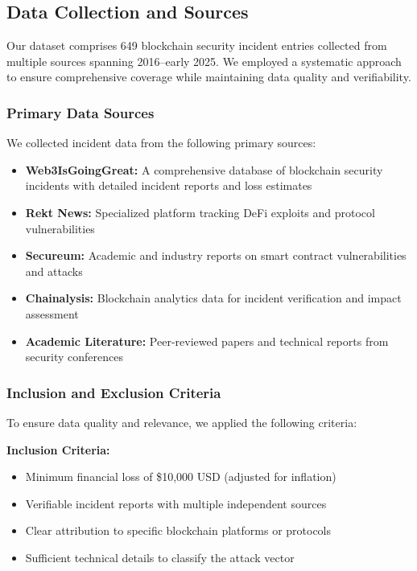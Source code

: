 \subsection{Data Collection and Sources}
\label{sec:data_collection}

Our dataset comprises 649 blockchain security incident entries collected from multiple sources spanning 2016--early 2025. We employed a systematic approach to ensure comprehensive coverage while maintaining data quality and verifiability.

\subsubsection{Primary Data Sources}
We collected incident data from the following primary sources:
\begin{itemize}
    \item \textbf{Web3IsGoingGreat:} A comprehensive database of blockchain security incidents with detailed incident reports and loss estimates
    \item \textbf{Rekt News:} Specialized platform tracking DeFi exploits and protocol vulnerabilities
    \item \textbf{Secureum:} Academic and industry reports on smart contract vulnerabilities and attacks
    \item \textbf{Chainalysis:} Blockchain analytics data for incident verification and impact assessment
    \item \textbf{Academic Literature:} Peer-reviewed papers and technical reports from security conferences
\end{itemize}

\subsubsection{Inclusion and Exclusion Criteria}
To ensure data quality and relevance, we applied the following criteria:

\textbf{Inclusion Criteria:}
\begin{itemize}
    \item Minimum financial loss of \$10,000 USD (adjusted for inflation)
    \item Verifiable incident reports with multiple independent sources
    \item Clear attribution to specific blockchain platforms or protocols
    \item Sufficient technical details to classify the attack vector
\end{itemize}

